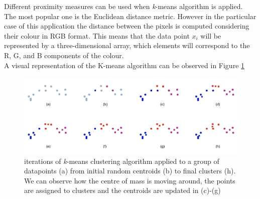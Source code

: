 \documentclass{usiinftr}
\begin{document}
Different proximity measures can be used when \textit{k}-means algorithm is applied. The most popular one is the Euclidean distance metric. 
However in the particular case of this application the distance between the pixels is computed considering their colour in RGB format. This means that the data point $x_i$ will be represented by a three-dimensional array, which elements will correspond to the R, G, and B components of the colour. \\
A visual representation of the K-means algorithm can be observed in Figure \ref{fig:1}
\begin{figure}[h]
	\centering
	\includegraphics[scale=0.2]{./img/Kmeans_final}
	\caption{iterations of \textit{k}-means clustering algorithm applied to a group of datapoints (a) from initial random centroids (b) to final clusters (h). We can observe how the centre of mass is moving around, the points are assigned to clusters and the centroids are updated in (c)-(g)}
	\label{fig:1}
\end{figure}
\end{document}
